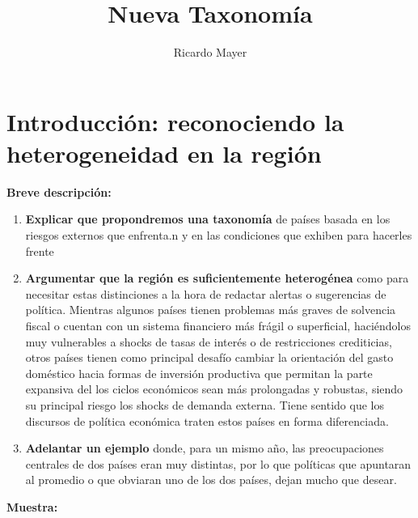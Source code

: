 \documentclass[12pt,a4paper]{article}
\author{Ricardo Mayer}
\title{Nueva Taxonomía}
\begin{document}
\maketitle
\tableofcontents
	
\section{Introducción: reconociendo la heterogeneidad en la región}

\textbf{Breve descripción:} \newline

\begin{enumerate}
	\item \textbf{Explicar que propondremos una taxonomía} de países basada en los riesgos externos que enfrenta.n y en las condiciones que exhiben para hacerles frente
	\item \textbf{Argumentar que la región es suficientemente heterogénea} como para necesitar estas distinciones a la hora de redactar alertas o sugerencias de política. Mientras algunos países tienen problemas más graves de solvencia fiscal o cuentan con un sistema financiero más frágil o superficial, haciéndolos muy vulnerables a shocks de tasas de interés o de restricciones crediticias, otros países tienen como principal desafío cambiar la orientación del gasto doméstico hacia formas de inversión productiva que permitan la parte expansiva del los ciclos económicos sean más prolongadas y robustas, siendo su principal riesgo los shocks de demanda externa. Tiene sentido que los discursos de política económica traten estos países en forma diferenciada.	
	\item \textbf{Adelantar un ejemplo} donde, para un mismo año, las preocupaciones centrales de dos países eran muy distintas, por lo que políticas que apuntaran al promedio o que obviaran uno de los dos países, dejan mucho que desear.	
\end{enumerate}

\textbf{Muestra:} \newline

%
\end{document}
